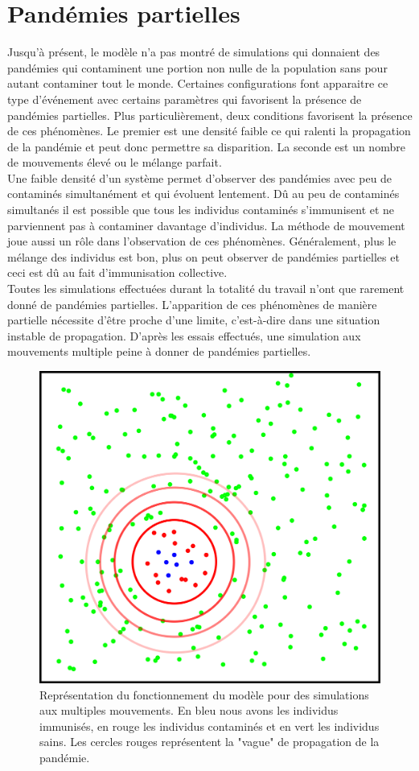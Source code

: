 \section{Pandémies partielles}

Jusqu'à présent, le modèle n'a pas montré de simulations qui donnaient des pandémies qui contaminent une portion non nulle de la population sans pour autant contaminer tout le monde. Certaines configurations font apparaitre ce type d'événement avec certains paramètres qui favorisent la présence de pandémies partielles. Plus particulièrement, deux conditions favorisent la présence de ces phénomènes. Le premier est une densité faible ce qui ralenti la propagation de la pandémie et peut donc permettre sa disparition. La seconde est un nombre de mouvements élevé ou le mélange parfait.\\

Une faible densité d'un système permet d'observer des pandémies avec peu de contaminés simultanément et qui évoluent lentement. Dû au peu de contaminés simultanés il est possible que tous les individus contaminés s'immunisent et ne parviennent pas à contaminer davantage d'individus. La méthode de mouvement joue aussi un rôle dans l'observation de ces phénomènes. Généralement, plus le mélange des individus est bon, plus on peut observer de pandémies partielles et ceci est dû au fait d'immunisation collective.\\

Toutes les simulations effectuées durant la totalité du travail n’ont que rarement donné de pandémies partielles. L’apparition de ces phénomènes de manière partielle nécessite d’être proche d’une limite, c’est-à-dire dans une situation instable de propagation. D’après les essais effectués, une simulation aux mouvements multiple peine à donner de pandémies partielles. 

\begin{figure}[h]
	\centering
	\captionsetup{justification=centering}
	\includegraphics[width=.5\textwidth]{Images/vague_propagation.png}
	\caption[Vague de propagation]{Représentation du fonctionnement du modèle pour des simulations aux multiples mouvements. En bleu nous avons les individus immunisés, en rouge les individus contaminés et en vert les individus sains. Les cercles rouges représentent la "vague" de propagation de la pandémie.}
\end{figure} 

